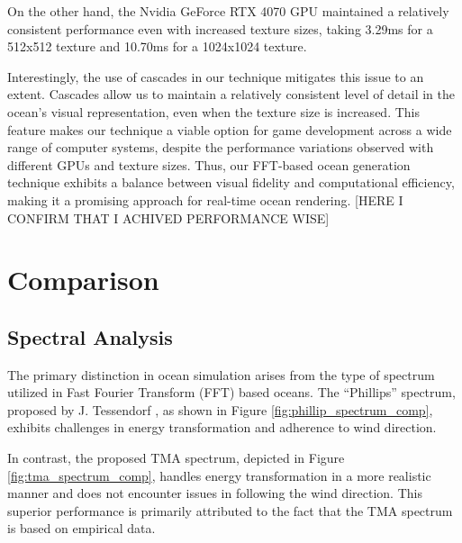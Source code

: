 On the other hand, the Nvidia GeForce RTX 4070 GPU maintained a relatively consistent performance even with increased texture sizes, taking 3.29ms for a 512x512 texture and 10.70ms for a 1024x1024 texture.

Interestingly, the use of cascades in our technique mitigates this issue to an extent. Cascades allow us to maintain a relatively consistent level of detail in the ocean’s visual representation, even when the texture size is increased. This feature makes our technique a viable option for game development across a wide range of computer systems, despite the performance variations observed with different GPUs and texture sizes. Thus, our FFT-based ocean generation technique exhibits a balance between visual fidelity and computational efficiency, making it a promising approach for real-time ocean rendering.
[HERE I CONFIRM THAT I ACHIVED PERFORMANCE WISE]

\section{Comparison} 

\subsection{Spectral Analysis} 
The primary distinction in ocean simulation arises from the type of spectrum utilized in Fast Fourier Transform (FFT) based oceans. The “Phillips” spectrum, proposed by J. Tessendorf \cite{tessendorf2001}, as shown in Figure \ref{fig:phillip_spectrum_comp}, exhibits challenges in energy transformation and adherence to wind direction.

In contrast, the proposed TMA spectrum, depicted in Figure \ref{fig:tma_spectrum_comp}, handles energy transformation in a more realistic manner and does not encounter issues in following the wind direction. This superior performance is primarily attributed to the fact that the TMA spectrum is based on empirical data.

